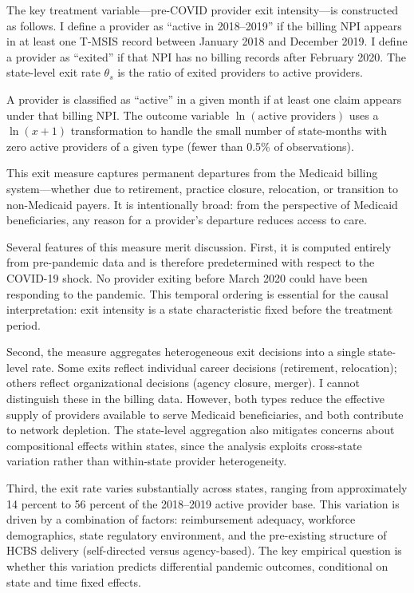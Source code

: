 \documentclass[12pt]{article}
\begin{document}
The key treatment variable---pre-COVID provider exit intensity---is constructed as follows. I define a provider as ``active in 2018--2019'' if the billing NPI appears in at least one T-MSIS record between January 2018 and December 2019. I define a provider as ``exited'' if that NPI has no billing records after February 2020. The state-level exit rate $\theta_s$ is the ratio of exited providers to active providers.

A provider is classified as ``active'' in a given month if at least one claim appears under that billing NPI. The outcome variable $\ln(\text{active providers})$ uses a $\ln(x+1)$ transformation to handle the small number of state-months with zero active providers of a given type (fewer than 0.5\% of observations).

This exit measure captures permanent departures from the Medicaid billing system---whether due to retirement, practice closure, relocation, or transition to non-Medicaid payers. It is intentionally broad: from the perspective of Medicaid beneficiaries, any reason for a provider's departure reduces access to care.

Several features of this measure merit discussion. First, it is computed entirely from pre-pandemic data and is therefore predetermined with respect to the COVID-19 shock. No provider exiting before March 2020 could have been responding to the pandemic. This temporal ordering is essential for the causal interpretation: exit intensity is a state characteristic fixed before the treatment period.

Second, the measure aggregates heterogeneous exit decisions into a single state-level rate. Some exits reflect individual career decisions (retirement, relocation); others reflect organizational decisions (agency closure, merger). I cannot distinguish these in the billing data. However, both types reduce the effective supply of providers available to serve Medicaid beneficiaries, and both contribute to network depletion. The state-level aggregation also mitigates concerns about compositional effects within states, since the analysis exploits cross-state variation rather than within-state provider heterogeneity.

Third, the exit rate varies substantially across states, ranging from approximately 14 percent to 56 percent of the 2018--2019 active provider base. This variation is driven by a combination of factors: reimbursement adequacy, workforce demographics, state regulatory environment, and the pre-existing structure of HCBS delivery (self-directed versus agency-based). The key empirical question is whether this variation predicts differential pandemic outcomes, conditional on state and time fixed effects.
\end{document}

